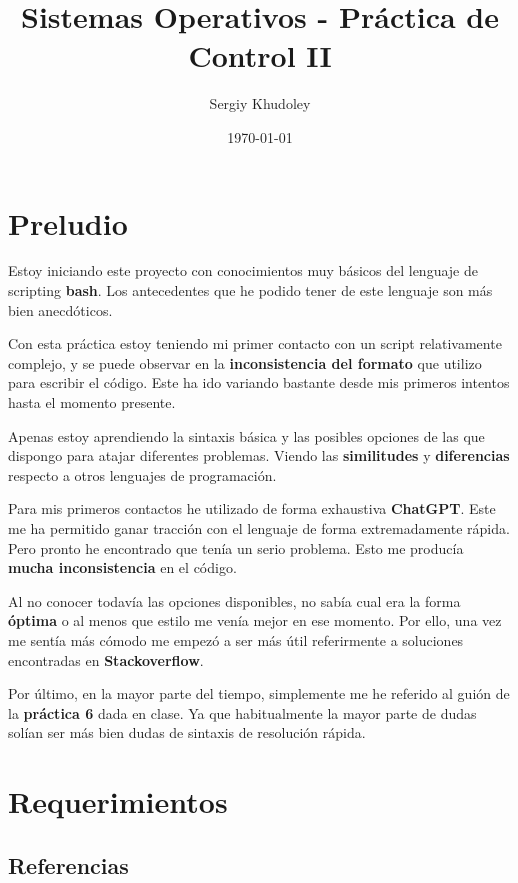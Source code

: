 \documentclass{article}
\title{Sistemas Operativos - Práctica de Control II}
\author{Sergiy Khudoley}
\date{\today}
\begin{document}
\pagestyle{fancy}

\maketitle
\tableofcontents



\section{Preludio}
    Estoy iniciando este proyecto con conocimientos muy básicos del lenguaje de scripting \textbf{bash}. Los antecedentes que he podido tener de este lenguaje son más bien anecdóticos.

    Con esta práctica estoy teniendo mi primer contacto con un script relativamente complejo, y se puede observar en la \textbf{inconsistencia del formato} que utilizo para escribir el código. Este ha ido variando bastante desde mis primeros intentos hasta el momento presente.
    
    Apenas estoy aprendiendo la sintaxis básica y las posibles opciones de las que dispongo para atajar diferentes problemas. Viendo las \textbf{similitudes} y \textbf{diferencias} respecto a otros lenguajes de programación.

    Para mis primeros contactos  he utilizado de forma exhaustiva \textbf{ChatGPT}. Este me ha permitido ganar tracción con el lenguaje de forma extremadamente rápida. Pero pronto he encontrado que tenía un serio problema. Esto me producía \textbf{mucha inconsistencia} en el código.
    
    Al no conocer todavía las opciones disponibles, no sabía cual era la forma \textbf{óptima} o al menos que estilo me venía mejor en ese momento. Por ello, una vez me sentía más cómodo me empezó a ser más útil referirmente a soluciones encontradas en \textbf{Stackoverflow}.

    Por último, en la mayor parte del tiempo, simplemente me he referido al guión de la \textbf{práctica 6} dada en clase. Ya que habitualmente la mayor parte de dudas solían ser más bien dudas de sintaxis de resolución rápida.

    
    
\newpage
\section{Requerimientos}
    \subsection{Referencias}
\end{document}
